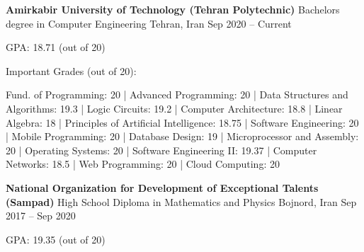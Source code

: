 \documentclass[]{awesome-cv}
\begin{document}
\begin{cventries}
	\cventry
	{\textbf{Amirkabir University of Technology (Tehran Polytechnic)}}
	{Bachelor\textquotesingle{}s degree in Computer Engineering}
	{Tehran, Iran}
	{Sep 2020 – Current}
	{\begin{cvitems}
		\vspace{1mm}
		\item[] {\hspace{-9mm} GPA: 18.71 (out of 20)}
		\vspace{1mm}
		\item[] {\hspace{-9mm} Important Grades (out of 20):}
		\vspace{1mm}
		\item {Fund. of Programming: 20 | Advanced Programming: 20 | Data Structures and Algorithms: 19.3 | 
		Logic Circuits: 19.2 | Computer Architecture: 18.8 | Linear Algebra: 18 | Principles of Artificial Intelligence: 18.75 | 
		Software Engineering: 20 | Mobile Programming: 20 | Database Design: 19 | Microprocessor and Assembly: 20 | Operating Systems: 20 | Software Engineering II: 19.37 | Computer Networks: 18.5 | Web Programming: 20 | Cloud Computing: 20}
	\end{cvitems}}
	\cventry
	{\textbf{National Organization for Development of Exceptional Talents (Sampad)}}
	{High School Diploma in Mathematics and Physics}
	{Bojnord, Iran}
	{Sep 2017 – Sep 2020}
	{\begin{cvitems}
		\vspace{1mm}
		\item[] {\hspace{-9mm} GPA: 19.35 (out of 20)}
	\end{cvitems}}
\end{cventries}
\end{document}
